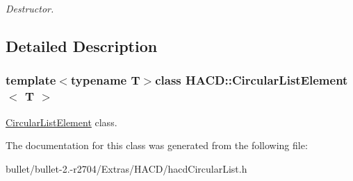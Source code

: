 \begin{DoxyCompactItemize}
\begin{DoxyCompactList}\small\item\em Destructor. \end{DoxyCompactList}\end{DoxyCompactItemize}


\subsection{Detailed Description}
\subsubsection*{template$<$typename T$>$class H\+A\+C\+D\+::\+Circular\+List\+Element$<$ T $>$}

\hyperlink{class_h_a_c_d_1_1_circular_list_element}{Circular\+List\+Element} class. 

The documentation for this class was generated from the following file\+:\begin{DoxyCompactItemize}
\item 
bullet/bullet-\/2.-\/r2704/\+Extras/\+H\+A\+C\+D/hacd\+Circular\+List.\+h\end{DoxyCompactItemize}
